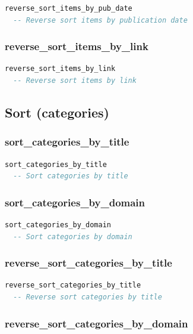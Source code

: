 \begin{lstlisting}[language=Eiffel]
reverse_sort_items_by_pub_date
  -- Reverse sort items by publication date
\end{lstlisting}

\subsubsection{reverse\_sort\_items\_by\_link}

\begin{lstlisting}[language=Eiffel]
reverse_sort_items_by_link
  -- Reverse sort items by link
\end{lstlisting}

\subsection{Sort (categories)}
\label{sec:channel-sort-categories}

\subsubsection{sort\_categories\_by\_title}

\begin{lstlisting}[language=Eiffel]
sort_categories_by_title
  -- Sort categories by title
\end{lstlisting}

\subsubsection{sort\_categories\_by\_domain}

\begin{lstlisting}[language=Eiffel]
sort_categories_by_domain
  -- Sort categories by domain
\end{lstlisting}

\subsubsection{reverse\_sort\_categories\_by\_title}

\begin{lstlisting}[language=Eiffel]
reverse_sort_categories_by_title
  -- Reverse sort categories by title
\end{lstlisting}

\subsubsection{reverse\_sort\_categories\_by\_domain}

